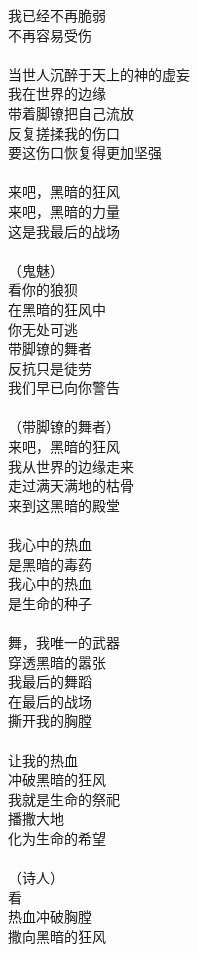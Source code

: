 我已经不再脆弱\\
不再容易受伤\\
\\
当世人沉醉于天上的神的虚妄\\
我在世界的边缘\\
带着脚镣把自己流放\\
反复搓揉我的伤口\\
要这伤口恢复得更加坚强\\
\\
来吧，黑暗的狂风\\
来吧，黑暗的力量\\
这是我最后的战场\\
\\
（鬼魅）\\
看你的狼狈\\
在黑暗的狂风中\\
你无处可逃\\
带脚镣的舞者\\
反抗只是徒劳\\
我们早已向你警告\\
\\
（带脚镣的舞者）\\
来吧，黑暗的狂风\\
我从世界的边缘走来\\
走过满天满地的枯骨\\
来到这黑暗的殿堂\\
\\
我心中的热血\\
是黑暗的毒药\\
我心中的热血\\
是生命的种子\\
\\
舞，我唯一的武器\\
穿透黑暗的嚣张\\
我最后的舞蹈\\
在最后的战场\\
撕开我的胸膛\\
\\
让我的热血\\
冲破黑暗的狂风\\
我就是生命的祭祀\\
播撒大地\\
化为生命的希望\\
\\
（诗人）\\
看\\
热血冲破胸膛\\
撒向黑暗的狂风\\
